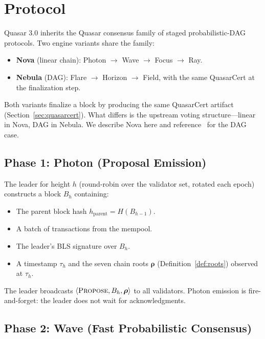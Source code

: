 \section{Protocol}

\label{sec:protocol}

Quasar 3.0 inherits the Quasar consensus family of staged probabilistic-DAG
protocols. Two engine variants share the family:

\begin{itemize}[leftmargin=2em,nosep]
\item \textbf{Nova} (linear chain): Photon $\to$ Wave $\to$ Focus $\to$ Ray.
\item \textbf{Nebula} (DAG): Flare $\to$ Horizon $\to$ Field, with the
      same QuasarCert at the finalization step.
\end{itemize}

Both variants finalize a block by producing the same QuasarCert
artifact (Section~\ref{sec:quasarcert}). What differs is the upstream
voting structure---linear in Nova, DAG in Nebula. We describe Nova here
and reference~\cite{lux-nova,lux-nebula} for the DAG case.

\subsection{Phase 1: Photon (Proposal Emission)}

The leader for height $h$ (round-robin over the validator set, rotated
each epoch) constructs a block $B_h$ containing:
\begin{itemize}[leftmargin=2em,nosep]
\item The parent block hash $h_{\text{parent}} = H(B_{h-1})$.
\item A batch of transactions from the mempool.
\item The leader's BLS signature over $B_h$.
\item A timestamp $\tau_h$ and the seven chain roots $\boldsymbol{\rho}$
      (Definition~\ref{def:roots}) observed at $\tau_h$.
\end{itemize}
The leader broadcasts $\langle \textsc{Propose}, B_h, \boldsymbol{\rho}
\rangle$ to all validators. Photon emission is fire-and-forget: the leader
does not wait for acknowledgments.

\subsection{Phase 2: Wave (Fast Probabilistic Consensus)}

